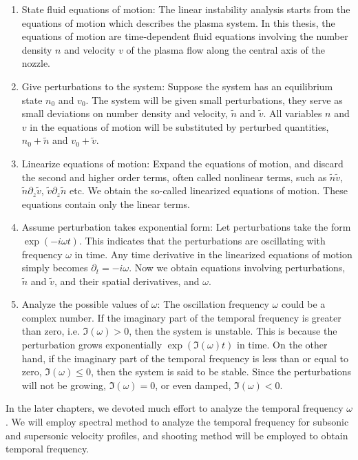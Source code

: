 \begin{enumerate}
	\item State fluid equations of motion: The linear instability analysis starts from the equations of motion which describes the plasma system. In this thesis, the equations of motion are time-dependent fluid equations involving the number density $n$ and velocity $v$ of the plasma flow along the central axis of the nozzle.
	\item Give perturbations to the system: Suppose the system has an equilibrium state $n_0$ and $v_0$. The system will be given small perturbations, they serve as small deviations on number density and velocity, $\tilde{n}$ and $\tilde{v}$. All variables $n$ and $v$ in the equations of motion will be substituted by perturbed quantities, $n_0+\tilde{n}$ and $v_0+\tilde{v}$.
	\item Linearize equations of motion: Expand the equations of motion, and discard the second and higher order terms, often called nonlinear terms, such as $\tilde{n}\tilde{v}$, $\tilde{n}\partial_z\tilde{v}$, $\tilde{v}\partial_z\tilde{n}$ etc. We obtain the so-called linearized equations of motion. These equations contain only the linear terms.
	\item Assume perturbation takes exponential form: Let perturbations take the form $\exp(-i\omega t)$. This indicates that the perturbations are oscillating with frequency $\omega$ in time. Any time derivative in the linearized equations of motion simply becomes $\partial_t = -i\omega$. Now we obtain equations involving perturbations, $\tilde{n}$ and $\tilde{v}$, and their spatial derivatives, and $\omega$.
	\item Analyze the possible values of $\omega$: The oscillation frequency $\omega$ could be a complex number. If the imaginary part of the temporal frequency is greater than zero, i.e. $\Im(\omega) > 0$, then the system is unstable. This is because the perturbation grows exponentially $\exp(\Im(\omega)t)$ in time. On the other hand, if the imaginary part of the temporal frequency is less than or equal to zero, $\Im(\omega) \leq 0$, then the system is said to be stable. Since the perturbations will not be growing, $\Im(\omega)=0$, or even damped, $\Im(\omega) < 0$.
\end{enumerate}

In the later chapters, we devoted much effort to analyze the temporal frequency $\omega$. We will employ spectral method to analyze the temporal frequency for subsonic and supersonic velocity profiles, and shooting method will be employed to obtain temporal frequency.

